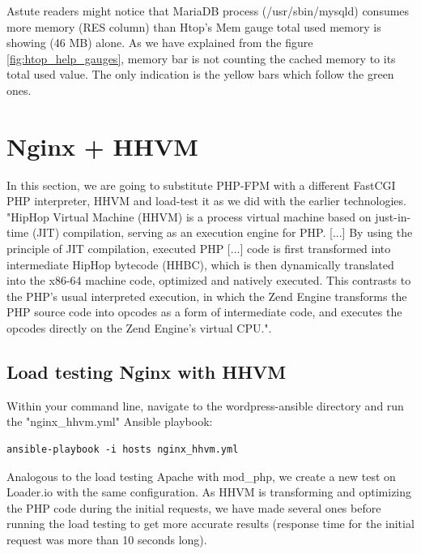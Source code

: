 Astute readers might notice that MariaDB process (/usr/sbin/mysqld) consumes more memory (RES column) than Htop's Mem gauge total used memory is showing (46 MB) alone. As we have explained from the figure \ref{fig:htop_help_gauges}, memory bar is not counting the cached memory to its total used value. The only indication is the yellow bars which follow the green ones.

\section{Nginx + HHVM}

In this section, we are going to substitute PHP-FPM with a different FastCGI PHP interpreter, HHVM and load-test it as we did with the earlier technologies. \\

"HipHop Virtual Machine (HHVM) is a process virtual machine based on just-in-time (JIT) compilation, serving as an execution engine for PHP. [...] By using the principle of JIT compilation, executed PHP [...] code is first transformed into intermediate HipHop bytecode (HHBC), which is then dynamically translated into the x86-64 machine code, optimized and natively executed. This contrasts to the PHP's usual interpreted execution, in which the Zend Engine transforms the PHP source code into opcodes as a form of intermediate code, and executes the opcodes directly on the Zend Engine's virtual CPU.". \cite{HHVM:Wiki} \\

\subsection{Load testing Nginx with HHVM}

Within your command line, navigate to the wordpress-ansible directory and run the "nginx\_hhvm.yml" Ansible playbook:

\begin{lstlisting}
ansible-playbook -i hosts nginx_hhvm.yml
\end{lstlisting}

Analogous to the load testing Apache with mod\_php, we create a new test on Loader.io with the same configuration. \cite{Loader.io:nginx_hhvm} As HHVM is transforming and optimizing the PHP code during the initial requests, we have made several ones before running the load testing to get more accurate results (response time for the initial request was more than 10 seconds long).


